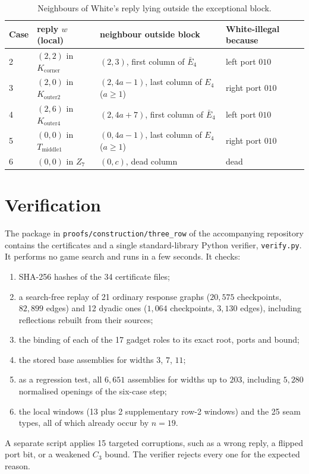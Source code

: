\documentclass[11pt]{amsart}
\theoremstyle{definition}
\newcommand{\Ebar}{\bar E_4}
\newcommand{\Kc}{K_{\mathrm{corner}}}
\newcommand{\Ktwo}{K_{\mathrm{outer2}}}
\newcommand{\Kfour}{K_{\mathrm{outer4}}}
\newcommand{\Tm}{T_{\mathrm{middle1}}}
\begin{document}
\begin{table}[ht]
\centering\small
\begin{tabular}{@{}l l l l@{}}
\toprule
Case & reply $w$ (local) & neighbour outside block & White-illegal because\\
\midrule
2 & $(2,2)$ in $\Kc$ & $(2,3)$, first column of $\Ebar$ & left port $010$\\
3 & $(2,0)$ in $\Ktwo$ & $(2,4a-1)$, last column of $E_4$ ($a\ge1$) & right port $010$\\
4 & $(2,6)$ in $\Kfour$ & $(2,4a+7)$, first column of $\Ebar$ & left port $010$\\
5 & $(0,0)$ in $\Tm$ & $(0,4a-1)$, last column of $E_4$ ($a\ge1$) & right port $010$\\
6 & $(0,0)$ in $Z_7$ & $(0,c)$, dead column & dead\\
\bottomrule
\end{tabular}
\caption{Neighbours of White's reply lying outside the exceptional block.}
\label{tab:neigh}
\end{table}

\section{Verification}\label{sec:verify}

The package in \texttt{proofs/construction/three\_row} of the accompanying
repository contains the certificates and a single standard-library Python
verifier, \texttt{verify.py}. It performs no game search and runs in a few
seconds. It checks:
\begin{enumerate}[label=(\arabic*)]
\item SHA-256 hashes of the 34 certificate files;
\item a search-free replay of 21 ordinary response graphs ($20{,}575$
checkpoints, $82{,}899$ edges) and 12 dyadic ones ($1{,}064$ checkpoints,
$3{,}130$ edges), including reflections rebuilt from their sources;
\item the binding of each of the 17 gadget roles to its exact root, ports and
bound;
\item the stored base assemblies for widths $3$, $7$, $11$;
\item as a regression test, all $6{,}651$ assemblies for widths up to $203$,
including $5{,}280$ normalised openings of the six-case step;
\item the local windows (13 plus 2 supplementary row-2 windows) and the 25
seam types, all of which already occur by $n=19$.
\end{enumerate}
A separate script applies 15 targeted corruptions, such as a wrong reply, a
flipped port bit, or a weakened $C_3$ bound. The verifier rejects every one
for the expected reason.
\end{document}
